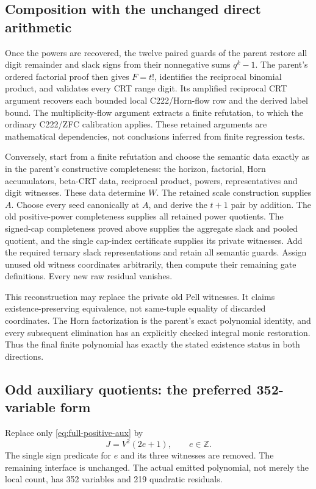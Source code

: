 \subsection{Composition with the unchanged direct arithmetic}
Once the powers are recovered, the twelve paired guards of the
parent restore all digit remainder and slack signs from their
nonnegative sums $q^k-1$. The parent's ordered factorial proof
then gives $F=t!$, identifies the reciprocal binomial product,
and validates every CRT range digit. Its amplified reciprocal CRT
argument recovers each bounded local C222/Horn-flow row and the
derived label bound. The multiplicity-flow argument extracts a
finite refutation, to which the ordinary C222/ZFC calibration
applies. These retained arguments are mathematical dependencies,
not conclusions inferred from finite regression tests.

Conversely, start from a finite refutation and choose the semantic
data exactly as in the parent's constructive completeness:
the horizon, factorial, Horn accumulators, beta-CRT data,
reciprocal product, powers, representatives and digit witnesses.
These data determine $W$. The retained scale construction supplies
$A$. Choose every seed canonically at $A$, and derive the $t+1$
pair by addition. The old positive-power completeness supplies all
retained power quotients. The signed-cap completeness proved above
supplies the aggregate slack and pooled quotient, and the single
cap-index certificate supplies its private witnesses. Add the
required ternary slack representations and retain all semantic
guards. Assign unused old witness coordinates arbitrarily, then
compute their remaining gate definitions. Every new raw residual
vanishes.

This reconstruction may replace the private old Pell witnesses.
It claims existence-preserving equivalence, not same-tuple equality
of discarded coordinates. The Horn factorization is the parent's
exact polynomial identity, and every subsequent elimination has
an explicitly checked integral monic restoration. Thus the final
finite polynomial has exactly the stated existence status in
both directions.

\subsection{Odd auxiliary quotients: the preferred 352-variable form}
Replace only \eqref{eq:full-positive-aux} by
\[
 J=V^2(2e+1),\qquad e\in\mathbb Z.
\]
The single sign predicate for $e$ and its three witnesses are
removed. The remaining interface is unchanged. The actual emitted
polynomial, not merely the local count, has 352 variables and
219 quadratic residuals.

